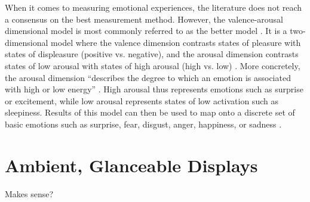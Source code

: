 When it comes to measuring emotional experiences, the literature does not reach a consensus on the best measurement method. However, the valence-arousal dimensional model is most commonly referred to as the better model \autocite{russell1980circumplex, mauss2009measures}. It is a two-dimensional model where the valence dimension contrasts states of pleasure with states of displeasure (positive vs. negative), and the arousal dimension contrasts states of low arousal with states of high arousal (high vs. low) \autocite{mauss2009measures}. More concretely, the arousal dimension \enquote{describes the degree to which an emotion is associated with high or low energy} \autocite[p.~1334]{tseng2014using}. High arousal thus represents emotions such as surprise or excitement, while low arousal represents states of low activation such as sleepiness. Results of this model can then be used to map onto a discrete set of basic emotions such as surprise, fear, disgust, anger, happiness, or sadness \autocite{brave2007emotion}.

\section{Ambient, Glanceable Displays}
Makes sense?

